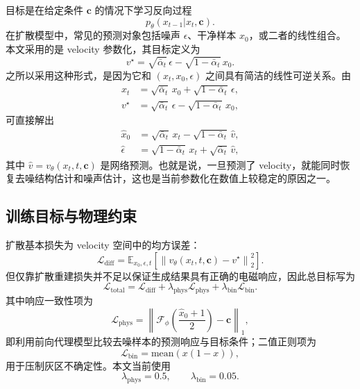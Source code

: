 \documentclass[10pt,a4paper]{article}
\newcommand{\loss}{\mathcal{L}}
\begin{document}
目标是在给定条件 $\mathbf{c}$ 的情况下学习反向过程
\begin{equation}
p_{\theta}(x_{t-1}|x_t,\mathbf{c}).
\end{equation}
在扩散模型中，常见的预测对象包括噪声 $\epsilon$、干净样本 $x_0$，或二者的线性组合。本文采用的是 velocity 参数化，其目标定义为
\begin{equation}
v^\star=\sqrt{\bar{\alpha}_t}\,\epsilon-\sqrt{1-\bar{\alpha}_t}\,x_0.
\end{equation}
之所以采用这种形式，是因为它和 $(x_t,x_0,\epsilon)$ 之间具有简洁的线性可逆关系。由
\begin{align}
x_t &= \sqrt{\bar{\alpha}_t}\,x_0+\sqrt{1-\bar{\alpha}_t}\,\epsilon,\\
v^\star &= \sqrt{\bar{\alpha}_t}\,\epsilon-\sqrt{1-\bar{\alpha}_t}\,x_0,
\end{align}
可直接解出
\begin{align}
\hat{x}_0 &= \sqrt{\bar{\alpha}_t}\,x_t-\sqrt{1-\bar{\alpha}_t}\,\hat{v},\\
\hat{\epsilon} &= \sqrt{1-\bar{\alpha}_t}\,x_t+\sqrt{\bar{\alpha}_t}\,\hat{v},
\end{align}
其中 $\hat{v}=v_{\theta}(x_t,t,\mathbf{c})$ 是网络预测。也就是说，一旦预测了 velocity，就能同时恢复去噪结构估计和噪声估计，这也是当前参数化在数值上较稳定的原因之一。

\subsection{训练目标与物理约束}

扩散基本损失为 velocity 空间中的均方误差：
\begin{equation}
\loss_{\mathrm{diff}}=\mathbb{E}_{x_0,\epsilon,t}\left[\left\|v_{\theta}(x_t,t,\mathbf{c})-v^\star\right\|_2^2\right].
\end{equation}
但仅靠扩散重建损失并不足以保证生成结果具有正确的电磁响应，因此总目标写为
\begin{equation}
\loss_{\mathrm{total}}=\loss_{\mathrm{diff}}+\lambda_{\mathrm{phys}}\loss_{\mathrm{phys}}+\lambda_{\mathrm{bin}}\loss_{\mathrm{bin}}.
\end{equation}
其中响应一致性项为
\begin{equation}
\loss_{\mathrm{phys}}=\left\|\mathcal{F}_{\phi}\!\left(\frac{\hat{x}_0+1}{2}\right)-\mathbf{c}\right\|_1,
\end{equation}
即利用前向代理模型比较去噪样本的预测响应与目标条件；二值正则项为
\begin{equation}
\loss_{\mathrm{bin}}=\mathrm{mean}\!\left(x(1-x)\right),
\end{equation}
用于压制灰区不确定性。本文当前使用
\begin{equation}
\lambda_{\mathrm{phys}}=0.5,\qquad \lambda_{\mathrm{bin}}=0.05.
\end{equation}
\end{document}
